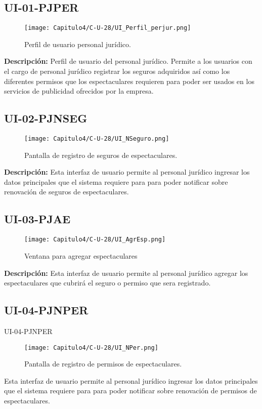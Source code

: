 \subsection{UI-01-PJPER}
\hypertarget{UI:UI-01-PJPER}{}
\begin{figure}[htbp!]
    \centering
    \texttt{[image: Capitulo4/C-U-28/UI\_Perfil\_perjur.png]}
    \caption{Perfil de usuario personal jurídico.}
    \label{fig:UI-01-PERPJ}
\end{figure}
\textbf{Descripción:} Perfil de usuario del personal jurídico. Permite a los usuarios con el cargo de personal jurídico registrar los seguros adquiridos así como los diferentes permisos que los espectaculares requieren para poder ser usados en los servicios de publicidad ofrecidos por la empresa.
\clearpage

\subsection{UI-02-PJNSEG}
\hypertarget{UI:UI-02-PJNSEG}{}
\begin{figure}[htbp!]
    \centering
    \texttt{[image: Capitulo4/C-U-28/UI\_NSeguro.png]}
    \caption{Pantalla de registro de seguros de espectaculares.}
    \label{fig:UI-02-Nseg}
\end{figure}
\textbf{Descripción:} Esta interfaz de usuario permite al personal jurídico ingresar los datos principales que el sistema requiere para para poder notificar sobre renovación de seguros de espectaculares.
\clearpage

\subsection{UI-03-PJAE}
\hypertarget{UI:UI-03-PJAE}{}
\begin{figure}[htbp!]
    \centering
    \texttt{[image: Capitulo4/C-U-28/UI\_AgrEsp.png]}
    \caption{Ventana para agregar espectaculares}
    \label{fig:my_label}
\end{figure}
\textbf{Descripción:} Esta interfaz de usuario permite al personal jurídico agregar los espectaculares que cubrirá el seguro o permiso que sera registrado.
\clearpage

\subsection{UI-04-PJNPER}
\hypertarget{UI:UI-04-PJNPER}{UI-04-PJNPER}
\begin{figure}[htbp!]
    \centering
    \texttt{[image: Capitulo4/C-U-28/UI\_NPer.png]}
    \caption{Pantalla de registro de permisos de espectaculares.}
    \label{fig:my_label}
\end{figure}
Esta interfaz de usuario permite al personal jurídico ingresar los datos principales que el sistema requiere para para poder notificar sobre renovación de permisos de espectaculares.
\clearpage

